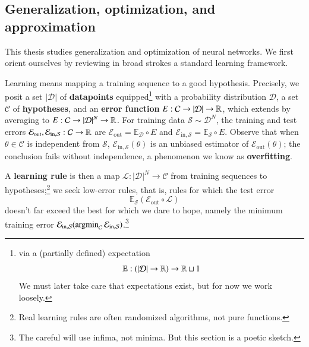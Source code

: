 \documentclass[openany, notitlepage, justified]{tufte-book}
\theoremstyle{plain}
\theoremstyle{definition}
\newcommand{\argmin}{\text{\textnormal{argmin}}}
\newcommand{\Cc}{\mathcal{C}}   \newcommand{\CC}{\mathbb{C}}
\newcommand{\Dd}{\mathcal{D}}
\newcommand{\Ee}{\mathcal{E}}   \newcommand{\EE}{\mathbb{E}}
\newcommand{\Hh}{\mathcal{H}}
\newcommand{\Ll}{\mathcal{L}}
\newcommand{\Ss}{\mathcal{S}}
\begin{document}
        \subsection{Generalization, optimization, and approximation}

        This thesis studies generalization and optimization of neural networks.
        We first orient ourselves by reviewing in broad strokes a
        standard\cite{ab12} learning framework.

        \newcommand{\Eout}{\Ee_{\text{out}}}
        \newcommand{\Ein }{\Ee_{\text{in},\Ss}}
        \newcommand{\optH}{\widehat{\argmin}_{\Hh}\,}
        \newcommand{\amH }{\argmin_{\Hh}\,}
        \newcommand{\amC }{\argmin_{\Cc}\,}

        Learning means mapping a training sequence to a good hypothesis.
        Precisely, we posit a set $|\Dd|$ of
        \textbf{datapoints} equipped\footnote{
            via a (partially defined) expectation
            $$\EE:(|\Dd|\to\RR)\to\RR\sqcup 1$$ 
            We must later take care that expectations exist, but
            for now we work loosely.
        } with a probability distribution $\Dd$,
        a set $\Cc$ of \textbf{hypotheses}, and an \textbf{error
        function} $E:\Cc\to|\Dd|\to\RR$,
        which extends by averaging to $E:\Cc\to|\Dd|^N\to\RR$.
        For training data $\Ss \sim \Dd^N$, the training and test errors
        $\Eout, \Ein: \Cc\to \RR$ are $\Eout = \EE_{\Dd} \circ E$ and $\Ein =
        \EE_{\Ss} \circ E$.  Observe that when $\theta\in \Cc$ is independent from $\Ss$,
        $\Ein(\theta)$ is an unbiased estimator of $\Eout(\theta)$; the
        conclusion fails without independence, a phenomenon we know as
        \textbf{overfitting}.

        \newpage
        A \textbf{learning rule} is then a
        map $\Ll:|\Dd|^N\to \Cc$ from training sequences to hypotheses;\footnote{
            Real learning rules are often randomized algorithms, not
            pure functions.
        } we seek low-error rules, that is, rules for which the test error
        $$
            \EE_{\Ss}(\Eout \circ \Ll)
        $$
        doesn't far exceed the best for which we dare to hope, namely the
        minimum training error $\Ein(\amC\Ein)$.\footnote{
            The careful will use infima, not minima.  But this section is
            a poetic sketch.
        }
\end{document}
